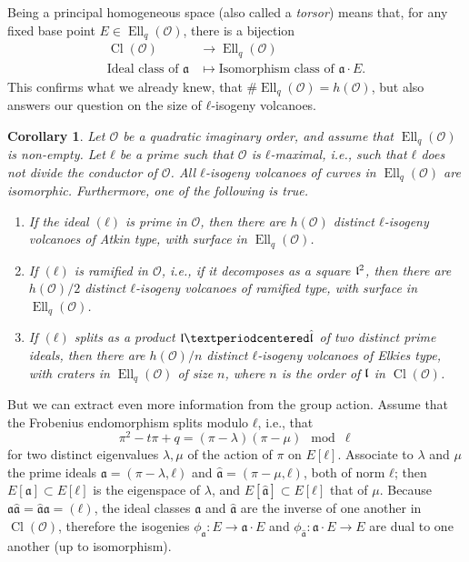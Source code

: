 \documentclass[10pt]{article}
\theoremstyle{plain}
\newtheorem{corollary}[theorem]{Corollary}
\theoremstyle{definition}
\DeclareMathOperator{\Cl}{Cl}
\DeclareMathOperator{\Ell}{Ell}
\def\O{\ensuremath{\mathcal{O}}}
\def\a{\ensuremath{\mathfrak{a}}}
\begin{document}
\begin{prposition}
Being a principal homogeneous space (also called a \emph{torsor})
means that, for any fixed base point $E∈\Ell_q(\O)$, there is a
bijection
\[
\begin{aligned}
\Cl(\O) &\longrightarrow \Ell_q(\O) \\
\text{Ideal class of }\a &\longmapsto \text{Isomorphism class of }\a\cdot E.
\end{aligned}
\]
This confirms what we already knew, that $\#\Ell_q(\O)=h(\O)$, but
also answers our question on the size of $ℓ$-isogeny volcanoes.

\begin{corollary}
  Let $\O$ be a quadratic imaginary order, and assume that
  $\Ell_q(\O)$ is non-empty. %
  Let $ℓ$ be a prime such that $\O$ is $ℓ$-maximal, i.e., such that
  $ℓ$ does not divide the conductor of $\O$. %
  All $ℓ$-isogeny volcanoes of curves in $\Ell_q(\O)$ are
  isomorphic. %
  Furthermore, one of the following is true.
  \begin{enumerate}
  \item[(0)] If the ideal $(ℓ)$ is prime in $\O$, then there are
    $h(\O)$ distinct $ℓ$-isogeny volcanoes of Atkin type, with surface
    in $\Ell_q(\O)$.
  \item[(1)] If $(ℓ)$ is ramified in $\O$, i.e., if it decomposes as a
    square $\frak l^2$, then there are $h(\O)/2$ distinct $ℓ$-isogeny
    volcanoes of ramified type, with surface in $\Ell_q(\O)$.
  \item[(2)] If $(ℓ)$ splits as a product $\frak l·\hat{\frak l}$ of
    two distinct prime ideals, then there are $h(\O)/n$ distinct
    $ℓ$-isogeny volcanoes of Elkies type, with craters in $\Ell_q(\O)$
    of size $n$, where $n$ is the order of $\frak l$ in $\Cl(\O)$.
  \end{enumerate}
\end{corollary}

But we can extract even more information from the group action. %
Assume that the Frobenius endomorphism splits modulo $ℓ$, i.e., that
\[π^2 - tπ + q = (π - λ)(π - μ) \mod\ell\] %
for two distinct eigenvalues $λ,μ$ of the action of $π$ on $E[ℓ]$. %
Associate to $λ$ and $μ$ the prime ideals $\a=(π-λ,ℓ)$ and
$\hat{\a}=(π-μ,ℓ)$, both of norm $ℓ$; then $E[\a]⊂E[ℓ]$ is the
eigenspace of $λ$, and $E[\hat{\a}]⊂E[ℓ]$ that of $μ$. %
Because $\a\hat{\a} = \hat{\a}\a = (ℓ)$, the ideal classes $\a$ and
$\hat{\a}$ are the inverse of one another in $\Cl(\O)$, therefore the
isogenies $ϕ_{\a}:E→\a·E$ and $ϕ_{\hat{\a}}:\a·E→E$ are dual to one
another (up to isomorphism). %


\end{prposition}
\end{document}
